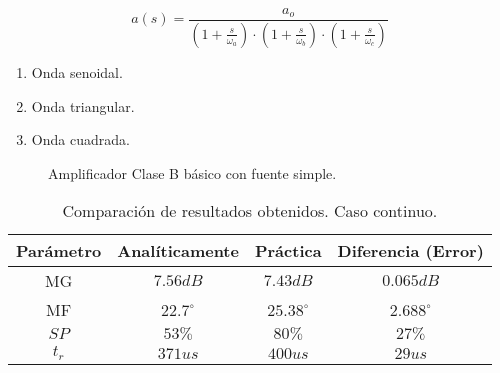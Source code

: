 


\begin{equation}
\label{eq:1}
a(s) = \frac{a_o}{(1+\frac{s}{\omega_a})\cdot (1+\frac{s}{\omega_b})\cdot (1+\frac{s}{\omega_c})} 
\end{equation}

\begin{enumerate}
\item Onda senoidal.
\item Onda triangular.
\item Onda cuadrada.
\end{enumerate}       %


\begin{figure}[h]
\centering
{}
\caption{Amplificador Clase B básico con fuente simple.}
\label{1.0}
\end{figure}



\begin{table}[H]
\begin{center}
\begin{tabular}{|c|c|c|c|}
\hline
Parámetro & Analíticamente & Práctica        & Diferencia (Error) \\ \hline
MG        & $7.56dB$       & $7.43dB$        & $0.065dB$          \\ \hline
MF        & $22.7^{\circ}$ & $25.38^{\circ}$ & $2.688^{\circ}$    \\ \hline
$SP$      & $53\%$         & $80\%$          & $27\%$             \\ \hline
$t_r$     & $371us$        & $400us$         & $29us$             \\ \hline
\end{tabular}
\caption{Comparación de resultados obtenidos. Caso continuo.}
\label{tab:1}
\end{center}
\end{table}
